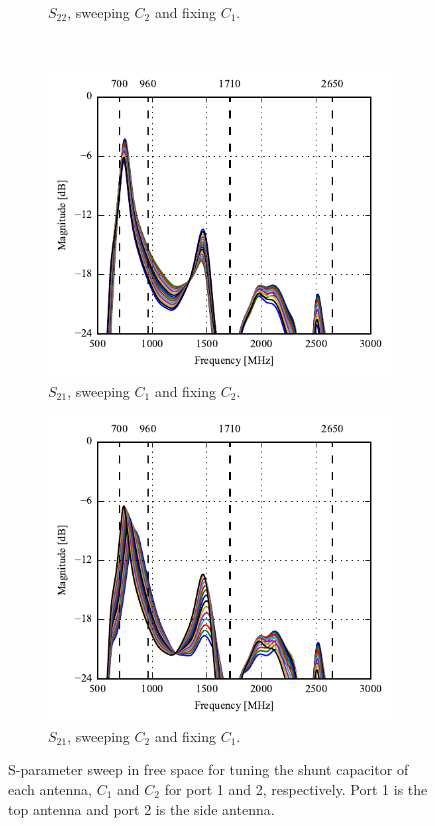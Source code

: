 \begin{figure}[htbp]
\begin{subfigure}[b]{0.49\linewidth}
        \caption{$S_{22}$, sweeping $C_2$ and fixing $C_1$.}
        \label{fig:ant1_s22}
    \end{subfigure}
~
    \begin{subfigure}[b]{0.49\linewidth}
        \centering
        \includegraphics{img/tech_sol/monopole/s21-s11}
        \caption{$S_{21}$, sweeping $C_1$ and fixing $C_2$.}
        \label{fig:ant1_s11}
    \end{subfigure}
    \hfill
    \begin{subfigure}[b]{0.49\linewidth}
        \centering
        \includegraphics{img/tech_sol/monopole/s21-s22}
        \caption{$S_{21}$, sweeping $C_2$ and fixing $C_1$.}
        \label{fig:ant1_s22}
    \end{subfigure}
    \caption{S-parameter sweep in free space for tuning the shunt capacitor of each antenna, $C_1$ and $C_2$ for port 1 and 2, respectively. Port 1 is the top antenna and port 2 is the side antenna.}
    \label{fig:sparam_mono_free_space}
\end{figure}

